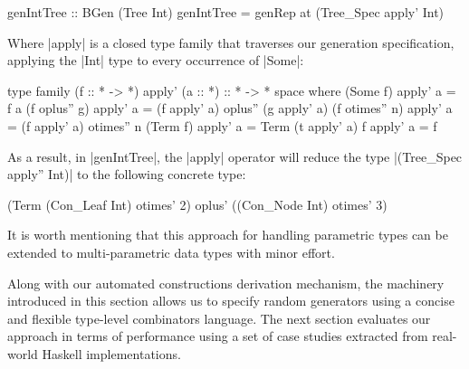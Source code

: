\begin{code}
genIntTree :: BGen (Tree Int)
genIntTree = genRep at (Tree_Spec apply' Int)
\end{code}
%
Where |apply| is a closed type family that traverses our generation
specification, applying the |Int| type to every occurrence of |Some|:

\begin{code}
type family (f :: * -> *) apply' (a :: *) :: * -> * space where
  (Some f)         apply'  a  = f a
  (f oplus''  g)   apply'  a  = (f apply' a) oplus'' (g apply' a)
  (f otimes'' n)   apply'  a  = (f apply' a) otimes'' n
  (Term f)         apply'  a  = Term (t apply' a)
  f                apply'  a  = f
\end{code}
%
As a result, in |genIntTree|, the |apply| operator will reduce the type
|(Tree_Spec apply'' Int)| to the following concrete type:

\begin{code}
(Term (Con_Leaf Int) otimes' 2) oplus' ((Con_Node Int) otimes' 3)
\end{code}

It is worth mentioning that this approach for handling parametric types can be
extended to multi-parametric data types with minor effort.


Along with our automated constructions derivation mechanism, the machinery
introduced in this section allows us to specify random generators using a
concise and flexible type-level combinators language.
%
The next section evaluates our approach in terms of performance using a set of
case studies extracted from real-world Haskell implementations.
